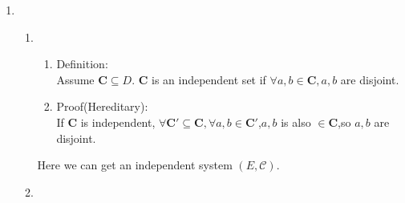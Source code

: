\documentclass[12pt,a4paper]{article}
\makeatletter
\newtheorem*{solution}{Solution}
\theoremstyle{definition}
\renewenvironment{solution}[1][Solution] {\par\pushQED{\qed}\normalfont\topsep6\p@\@plus6\p@\relax\trivlist\item[\hskip\labelsep\bfseries#1\@addpunct{.}]\ignorespaces}{\popQED\endtrivlist\@endpefalse} \makeatother
\makeatother
\begin{document}
\begin{enumerate}
\begin{enumerate}
    \end{enumerate}
        	    \begin{solution}
    	    ~\par
    	     \begin{enumerate}
    	     \item
    	        \begin{enumerate}
    	            \item Definition:\\
    	            Assume $\mathbf{C}\subseteq D$.  $\mathbf{C}$ is an independent set if $\forall a,b \in \mathbf{C},a,b$ are disjoint.
    	            \item Proof(Hereditary):\\
    	            If $\mathbf{C}$ is independent, $\forall \mathbf{C'}\subseteq \mathbf{C},\forall a,b\in \mathbf{C'}$,$a,b$ is also $\in \mathbf{C}$,so $a,b$ are disjoint.\\
    	        \end{enumerate}
    	        Here we can get an independent system $(E,\mathcal{C})$.
    	        \item 
    \begin{minipage}[t]{0.8\textwidth}
    	\begin{algorithm}[H]
        		

\end{algorithm}
\end{minipage}
\end{enumerate}
\end{solution}
\end{enumerate}
\end{document}
